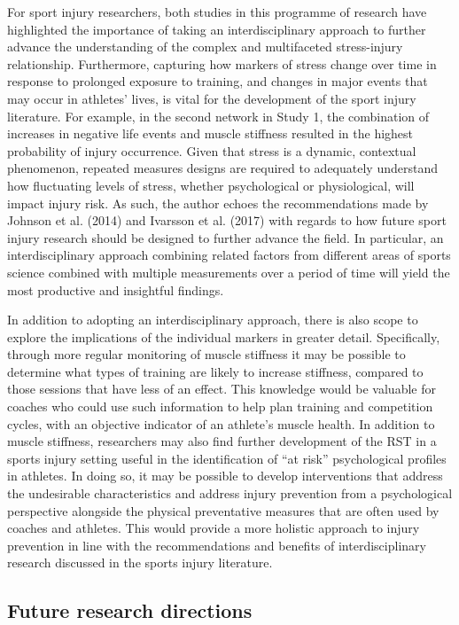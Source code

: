 \documentclass[man,floatsintext]{apa6}
\begin{document}
For sport injury researchers, both studies in this programme of research have highlighted the importance of taking an interdisciplinary approach to further advance the understanding of the complex and multifaceted stress-injury relationship.
Furthermore, capturing how markers of stress change over time in response to prolonged exposure to training, and changes in major events that may occur in athletes' lives, is vital for the development of the sport injury literature.
For example, in the second network in Study 1, the combination of increases in negative life events and muscle stiffness resulted in the highest probability of injury occurrence.
Given that stress is a dynamic, contextual phenomenon, repeated measures designs are required to adequately understand how fluctuating levels of stress, whether psychological or physiological, will impact injury risk.
As such, the author echoes the recommendations made by Johnson et al. (2014) and Ivarsson et al. (2017) with regards to how future sport injury research should be designed to further advance the field.
In particular, an interdisciplinary approach combining related factors from different areas of sports science combined with multiple measurements over a period of time will yield the most productive and insightful findings.

In addition to adopting an interdisciplinary approach, there is also scope to explore the implications of the individual markers in greater detail.
Specifically, through more regular monitoring of muscle stiffness it may be possible to determine what types of training are likely to increase stiffness, compared to those sessions that have less of an effect.
This knowledge would be valuable for coaches who could use such information to help plan training and competition cycles, with an objective indicator of an athlete's muscle health.
In addition to muscle stiffness, researchers may also find further development of the RST in a sports injury setting useful in the identification of \enquote{at risk} psychological profiles in athletes.
In doing so, it may be possible to develop interventions that address the undesirable characteristics and address injury prevention from a psychological perspective alongside the physical preventative measures that are often used by coaches and athletes.
This would provide a more holistic approach to injury prevention in line with the recommendations and benefits of interdisciplinary research discussed in the sports injury literature.

\hypertarget{future-research-directions}{%
\subsection{Future research directions}\label{future-research-directions}}
\end{document}
